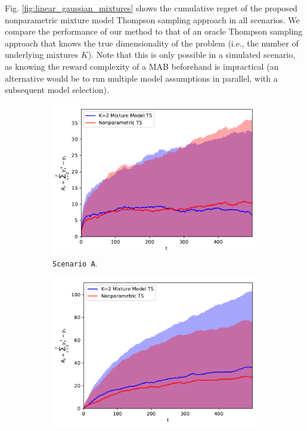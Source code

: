 \documentclass{article}
\newcommand{\ie}{i.e., }
\begin{document}
Fig. \ref{fig:linear_gaussian_mixtures} shows the cumulative regret of the proposed nonparametric mixture model Thompson sampling approach in all scenarios. We compare the performance of our method to that of an oracle Thompson sampling approach that knows the true dimensionality of the problem (\ie the number of underlying mixtures $K$). Note that this is only possible in a simulated scenario, as knowing the reward complexity of a MAB beforehand is impractical (an alternative would be to run multiple model assumptions in parallel, with a subsequent model selection).

\begin{figure}[!ht]
	\centering
	\begin{subfigure}[b]{0.325\textwidth}
		\includegraphics[width=\textwidth]{./figs/linearGaussianMixture/easy/cumregret_priorK2_MCMC_R137}
		\caption{\texttt{Scenario A}.}
		\label{fig:linear_gaussian_mixture_easy}
	\end{subfigure}
	\begin{subfigure}[b]{0.325\textwidth}
		\includegraphics[width=\textwidth]{./figs/linearGaussianMixture/hard/cumregret_priorK2_MCMC_R126}

\end{subfigure}
\end{figure}
\end{document}

